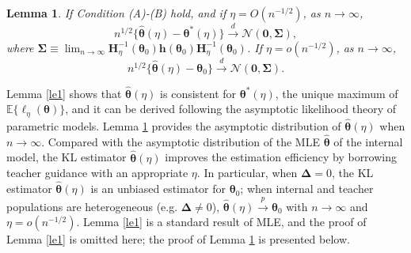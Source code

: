 \documentclass{article}
\theoremstyle{plain}
\newtheorem{lemma}[theorem]{Lemma}
\theoremstyle{definition}
\theoremstyle{remark}
\begin{document}
\begin{lemma}\label{le2}
If Condition (A)-(B) hold, and if $\eta = O(n^{-1/2})$, as $n \rightarrow \infty$,
\begin{equation*}
    n^{1/2} \{\hat{\boldsymbol{\theta}}(\eta)-\boldsymbol{\theta}^{*}(\eta) \} \overset{d}{\rightarrow} \mathcal{N}(\boldsymbol{0}, \boldsymbol{\Sigma}),
\label{eq:lemma2-1}
\end{equation*}
where $\boldsymbol{\Sigma}\equiv\lim_{n\rightarrow \infty}\boldsymbol{H}_\eta^{-1}(\boldsymbol{\theta}_0) \boldsymbol{h}(\boldsymbol{\theta}_0)\boldsymbol{H}_\eta^{-1}(\boldsymbol{\theta}_0)
$. If $\eta = o(n^{-1/2})$, as $n \rightarrow \infty$,
\begin{equation*}
    n^{1/2}\{\hat{\boldsymbol{\theta}}(\eta)-\boldsymbol{\theta}_0\}\overset{d}{\rightarrow} \mathcal{N}(\boldsymbol{0}, \boldsymbol{\Sigma}).
\label{eq:lemma2-2}
\end{equation*}
\end{lemma}

Lemma \ref{le1} shows that $\hat{\boldsymbol{\theta}}(\eta)$ is consistent for $\boldsymbol{\theta}^*(\eta)$, the unique maximum of $\mathbb{E}\{\ell_{\eta}(\boldsymbol{\theta})\}$, and it can be derived following the asymptotic likelihood theory of parametric models. Lemma \ref{le2} provides the asymptotic distribution of $\hat{\boldsymbol{\theta}}(\eta)$ when $n \rightarrow \infty$. Compared with the asymptotic distribution of the MLE $\hat{\boldsymbol{\theta}}$ of the internal model, the KL estimator $\hat{\boldsymbol{\theta}}(\eta)$ improves the estimation efficiency by borrowing teacher guidance with an appropriate $\eta$. In particular, when $\boldsymbol{\Delta}=0$, the KL estimator $\hat{\boldsymbol{\theta}}(\eta)$ is an unbiased estimator for $\boldsymbol{\theta}_0$; when internal and teacher populations are heterogeneous (e.g. $\boldsymbol{\Delta}\neq0$), $\hat{\boldsymbol{\theta}}(\eta)\overset{p}{\rightarrow}\boldsymbol{\theta}_0$ with $n \rightarrow \infty$ and $\eta = o(n^{-1/2})$. Lemma \ref{le1} is a standard result of MLE, and the proof of Lemma \ref{le1} is omitted here; the proof of Lemma \ref{le2} is presented below.
\end{document}
